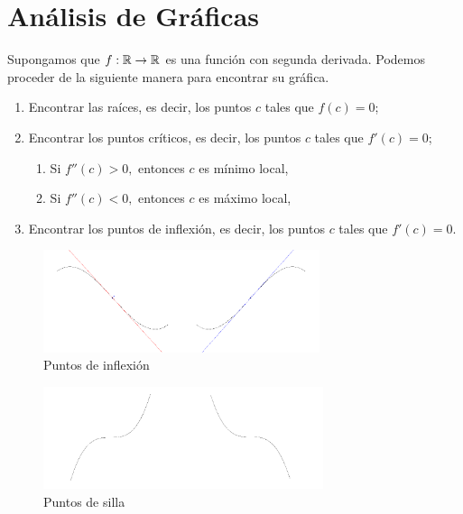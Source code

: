 \section{Análisis de Gráficas}


    Supongamos que $f:\mathbb{R} \to \mathbb{R}$ es una función con segunda derivada. Podemos proceder de la siguiente manera para encontrar su
    gráfica.
    \begin{enumerate}
        \item Encontrar las raíces, es decir, los puntos $c$ tales que $f(c)=0$;
        \item Encontrar los puntos críticos, es decir, los puntos $c$ tales que $f'(c)=0$;
        \begin{enumerate}
            \item Si $f''(c)>0,$ entonces $c$ es mínimo local,
            \item Si $f''(c)<0,$ entonces $c$ es máximo local,
        \end{enumerate}
        \item Encontrar los puntos de inflexión, es decir, los puntos $c$ tales que $f'(c)=0$.
    \end{enumerate}



    \begin{figure}[t]
        \centering
        \includegraphics[height=3cm,bb=0 0 736 272,keepaspectratio=true]{./calculo/puntos_inflexion.png}
        \caption{Puntos de inflexión}
        \label{fig:inflexion}
    \end{figure}


    \begin{figure}[t]
        \centering
        \includegraphics[height=3cm,bb=0 0 735 268,keepaspectratio=true]{./calculo/puntos_silla.png}
        \caption{Puntos de silla}
        \label{fig:silla}
    \end{figure}




